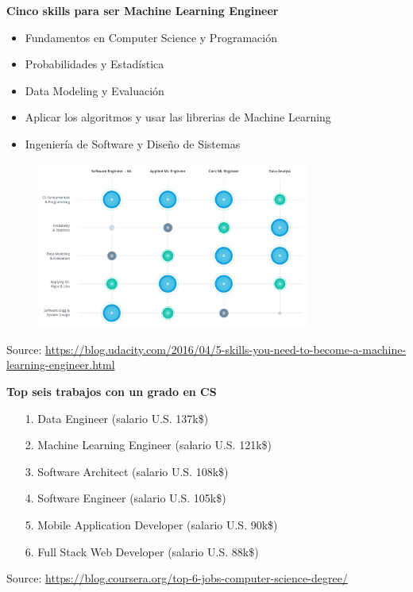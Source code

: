 \documentclass[english,svgnames,notes=hide,12pt]{beamer}
\begin{document}
\begin{frame}
    \textbf{Cinco skills para ser Machine Learning Engineer}
    \begin{itemize}
        \item Fundamentos en Computer Science y Programaci\'on
        \item Probabilidades y Estad\'istica
        \item Data Modeling y Evaluaci\'on
        \item Aplicar los algoritmos y usar las librerias de Machine Learning
        \item Ingenier\'ia de Software y Dise\~no de Sistemas
    \end{itemize}
\end{frame}

\begin{frame}
    \begin{figure}
        \includegraphics[width=0.8\textwidth]{imgs/cs-skills.png}
    \end{figure}
    \centering\tiny{Source: \url{https://blog.udacity.com/2016/04/5-skills-you-need-to-become-a-machine-learning-engineer.html}}
\end{frame}

\begin{frame}
    \textbf{Top seis trabajos con un grado en CS}
    \begin{itemize}
        \item[\small{1.}] Data Engineer (salario U.S. 137k\$)
        \item[\small{2.}] Machine Learning Engineer (salario U.S. 121k\$)
        \item[\small{3.}] Software Architect (salario U.S. 108k\$)
        \item[\small{4.}] Software Engineer (salario U.S. 105k\$)
        \item[\small{5.}] Mobile Application Developer (salario U.S. 90k\$)
        \item[\small{6.}] Full Stack Web Developer (salario U.S. 88k\$)
    \end{itemize}

    \tiny{Source: \url{https://blog.coursera.org/top-6-jobs-computer-science-degree/}}
\end{frame}
\end{document}
